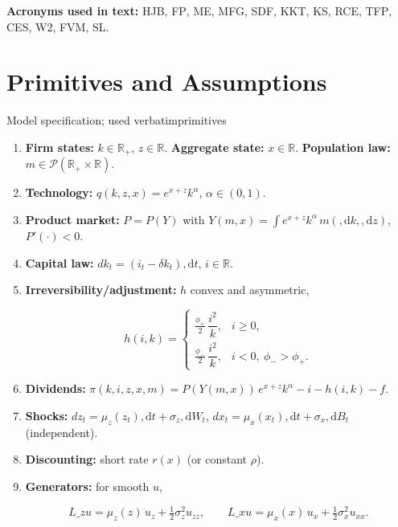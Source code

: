 ﻿\documentclass[11pt,letterpaper,oneside]{article}
\numberwithin{equation}{section}
\newcommand{\ac}[1]{{\mdseries\textsc{#1}}}
\newcommand{\printacronyms}{}
\newcommand{\R}{\mathbb{R}}
\newcommand{\1}{\mathbf{1}}
\newcommand{\diff}{,\mathrm{d}}
\newcommand{\Lz}{L\_z}
\newcommand{\Lx}{L\_x}
\newcommand{\YY}{Y(m,x)}
\begin{document}
\medskip
\noindent\textbf{Acronyms used in text:} \ac{HJB}, \ac{FP}, \ac{ME}, \ac{MFG}, \ac{SDF}, \ac{KKT}, \ac{KS}, \ac{RCE}, \ac{TFP}, \ac{CES}, \ac{W2}, \ac{FVM}, \ac{SL}.
\medskip

\printacronyms

\section{Primitives and Assumptions}

\begin{assumption}{Model specification; used verbatim}{primitives}
\begin{enumerate}[label=(\roman*),itemsep=0.25em]
\item \textbf{Firm states:} $k\in\R_+$, $z\in\R$. \textbf{Aggregate state:} $x\in\R$. \textbf{Population law:} $m\in\mathcal P(\R_+\times\R)$.
\item \textbf{Technology:} $q(k,z,x)=e^{x+z}k^\alpha$, $\alpha\in(0,1)$.
\item \textbf{Product market:} $P=P(Y)$ with $Y(m,x)=\int e^{x+z}k^\alpha\, m(\diff k,\diff z)$, $P'(\cdot)<0$.
\item \textbf{Capital law:} $dk_t=(i_t-\delta k_t)\diff t$, $i\in\R$.
\item \textbf{Irreversibility/adjustment:} $h$ convex and asymmetric,

$$
h(i,k)=
\begin{cases}
\tfrac{\phi_+}{2}\,\dfrac{i^2}{k}, & i\ge 0,\\[3pt]
\tfrac{\phi_-}{2}\,\dfrac{i^2}{k}, & i<0,\ \phi_->\phi_+.
\end{cases}
$$

\item \textbf{Dividends:} $\pi(k,i,z,x,m)=P(\YY)\,e^{x+z}k^\alpha - i - h(i,k) - f$.
\item \textbf{Shocks:} $dz_t=\mu_z(z_t)\diff t+\sigma_z\diff W_t$, $dx_t=\mu_x(x_t)\diff t+\sigma_x\diff B_t$ (independent).
\item \textbf{Discounting:} short rate $r(x)$ (or constant $\rho$).
\item \textbf{Generators:} for smooth $u$,

$$
\Lz u=\mu_z(z)\,u_z+\tfrac12\sigma_z^2 u_{zz},\qquad
\Lx u=\mu_x(x)\,u_x+\tfrac12\sigma_x^2 u_{xx}.
$$

\end{enumerate}
\end{assumption}
\end{document}
